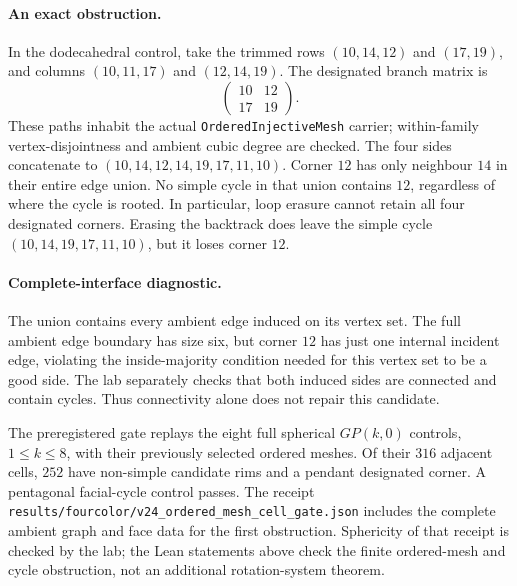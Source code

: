\paragraph{An exact obstruction.}
In the dodecahedral control, take the trimmed rows
$(10,14,12)$ and $(17,19)$, and columns $(10,11,17)$ and $(12,14,19)$.
The designated branch matrix is
\[
 \begin{pmatrix}10&12\\17&19\end{pmatrix}.
\]
These paths inhabit the actual \texttt{OrderedInjectiveMesh} carrier;
within-family vertex-disjointness and ambient cubic degree are checked.
The four sides concatenate to
$(10,14,12,14,19,17,11,10)$. Corner $12$ has only neighbour $14$ in
their entire edge union. No simple cycle in that union contains $12$,
regardless of where the cycle is rooted. In particular, loop erasure
cannot retain all four designated corners.
Erasing the backtrack does leave the simple cycle
$(10,14,19,17,11,10)$, but it loses corner $12$.

\paragraph{Complete-interface diagnostic.}
The union contains every ambient edge induced on its vertex set. The
full ambient edge boundary has size six, but corner $12$ has just one
internal incident edge, violating the inside-majority condition needed
for this vertex set to be a good side.
The lab separately checks that both induced sides are connected and
contain cycles. Thus connectivity alone does not repair this candidate.

The preregistered gate replays the eight full spherical $GP(k,0)$ controls,
$1\le k\le8$, with their previously selected ordered meshes. Of their
$316$ adjacent cells, $252$ have non-simple candidate rims and a pendant
designated corner. A pentagonal facial-cycle control passes. The receipt
\texttt{results/fourcolor/v24\_ordered\_mesh\_cell\_gate.json} includes
the complete ambient graph and face data for the first obstruction.
Sphericity of that receipt is checked by the lab; the Lean statements above
check the finite ordered-mesh and cycle obstruction, not an additional
rotation-system theorem.


